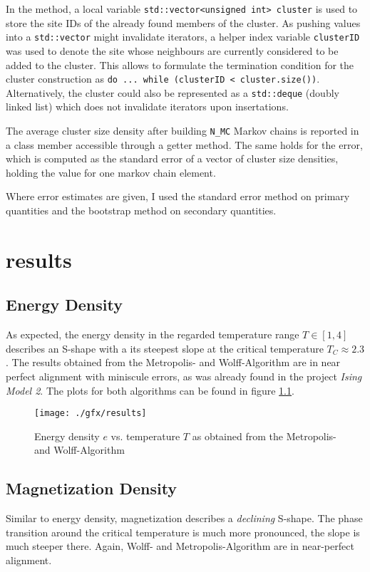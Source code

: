 In the method, a local variable \texttt{std::vector<unsigned int> cluster} is used to store the site IDs of the already found members of the cluster. As pushing values into a \texttt{std::vector} might invalidate iterators, a helper index variable \texttt{clusterID} was used to denote the site whose neighbours are currently considered to be added to the cluster. This allows to formulate the termination condition for the cluster construction as \texttt{do ... while (clusterID < cluster.size())}. Alternatively, the cluster could also be represented as a \texttt{std::deque} (doubly linked list) which does not invalidate iterators upon insertations.

The average cluster size density after building \texttt{N\_MC} Markov chains is reported in a class member accessible through a getter method. The same holds for the error, which is computed as the standard error of a vector of cluster size densities, holding the value for one markov chain element.

Where error estimates are given, I used the standard error method on primary quantities and the bootstrap method on secondary quantities.

\chapter{results}
\section{Energy Density}
As expected, the energy density in the regarded temperature range $T \in [1, 4]$ describes an S-shape with a its steepest slope at the critical temperature $T_C \approx 2.3$. The results obtained from the Metropolis- and Wolff-Algorithm are in near perfect alignment with miniscule errors, as was already found in the project \emph{Ising Model 2}. The plots for both algorithms can be found in figure \ref{fig:evsT}.

\begin{figure}
	\texttt{[image: ./gfx/results]}
	\caption%
{Energy density $e$ vs. temperature $T$ as obtained from the Metropolis- and Wolff-Algorithm}
\label{fig:evsT}
\end{figure}

\section{Magnetization Density}
Similar to energy density, magnetization describes a \emph{declining} S-shape. The phase transition around the critical temperature is much more pronounced, \ie the slope is much steeper there. Again, Wolff- and Metropolis-Algorithm are in near-perfect alignment. 

